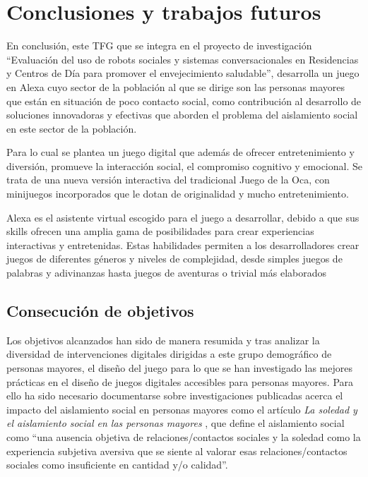 \section{Conclusiones y trabajos futuros}

En conclusión, este TFG que se integra en el proyecto de investigación \enquote{Evaluación del uso de robots sociales y sistemas conversacionales en Residencias y Centros de Día para promover el envejecimiento saludable}, desarrolla un juego en Alexa cuyo sector de la población al que se dirige son las personas mayores que están en situación de poco contacto social, como contribución al desarrollo de soluciones innovadoras y efectivas que aborden el problema del aislamiento social en este sector de la población.

Para lo cual se plantea un juego digital que además de ofrecer entretenimiento y diversión, promueve la interacción social, el compromiso cognitivo y emocional. Se trata de una nueva versión interactiva del tradicional Juego de la Oca, con minijuegos incorporados que le dotan de originalidad y mucho entretenimiento.

Alexa es el asistente virtual escogido para el juego a desarrollar, debido a que sus skills ofrecen una amplia gama de posibilidades para crear experiencias interactivas y entretenidas. Estas habilidades permiten a los desarrolladores crear juegos de diferentes géneros y niveles de complejidad, desde simples juegos de palabras y adivinanzas hasta juegos de aventuras o trivial más elaborados

\subsection{Consecución de objetivos}

Los objetivos alcanzados han sido de manera resumida y tras analizar la diversidad de intervenciones digitales dirigidas a este grupo demográfico de personas mayores, el diseño del juego para lo que se han investigado las mejores prácticas en el diseño de juegos digitales accesibles para personas mayores. Para ello ha sido necesario documentarse sobre investigaciones publicadas acerca el impacto del aislamiento social en personas mayores como el artículo \textit{La soledad y el aislamiento social en las personas mayores} \parencite{ArruebarrenaCabaco2020}, que define el aislamiento social como \enquote{una ausencia objetiva de relaciones/contactos sociales y la soledad como la experiencia subjetiva aversiva que se siente al valorar esas relaciones/contactos sociales como insuficiente en cantidad y/o calidad}.

